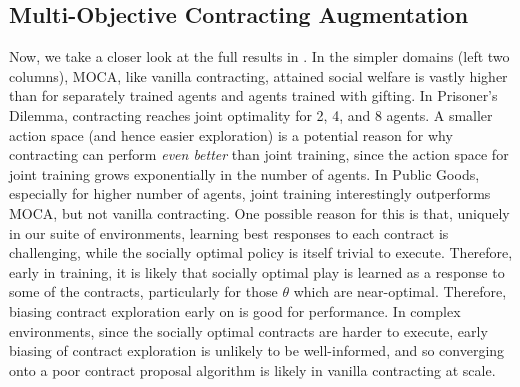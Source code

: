 \documentclass[referee,sn-basic]{sn-jnl}
\theoremstyle{thmstyleone}%
\theoremstyle{thmstyletwo}%
\theoremstyle{thmstylethree}%
\begin{document}
\subsection{Multi-Objective Contracting Augmentation} Now, we take a closer look at the full results in . In the simpler domains (left two columns), MOCA, like vanilla contracting, attained social welfare is vastly higher than for separately trained agents and agents trained with gifting. In Prisoner's Dilemma, contracting reaches joint optimality for 2, 4, and 8 agents. A smaller action space (and hence easier exploration) is a potential reason for why contracting can perform \emph{even better} than joint training, since the action space for joint training grows exponentially in the number of agents. In Public Goods, especially for higher number of agents, joint training interestingly outperforms MOCA, but not vanilla contracting. One possible reason for this is that, uniquely in our suite of environments, learning best responses to each contract is challenging, while the socially optimal policy is itself trivial to execute. Therefore, early in training, it is likely that socially optimal play is learned as a response to some of the contracts, particularly for those $\theta$ which are near-optimal. Therefore, biasing contract exploration early on is good for performance. In complex environments, since the socially optimal contracts are harder to execute, early biasing of contract exploration is unlikely to be well-informed, and so converging onto a poor contract proposal algorithm is likely in vanilla contracting at scale.
\end{document}
